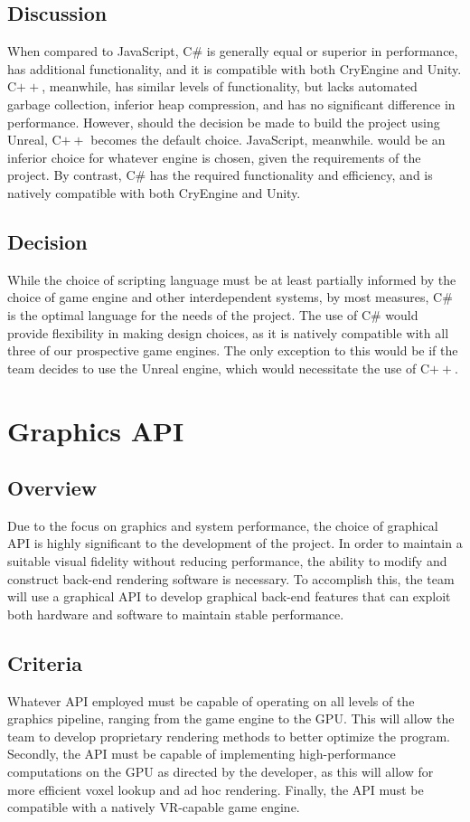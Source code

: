 \documentclass[onecolumn, draftclsnofoot,10pt, compsoc]{IEEEtran}
\begin{document}
\subsection{Discussion}
When compared to JavaScript, C\# is generally equal or superior in performance, has additional functionality, and it is compatible with both CryEngine and Unity. C$++$, meanwhile, has similar levels of functionality, but lacks automated garbage collection, inferior heap compression, and has no significant difference in performance. However, should the decision be made to build the project using Unreal, C$++$ becomes the default choice. JavaScript, meanwhile. would be an inferior choice for whatever engine is chosen, given the requirements of the project. By contrast, C\# has the required functionality and efficiency, and is natively compatible with both CryEngine and Unity. 

\subsection{Decision}
While the choice of scripting language must be at least partially informed by the choice of game engine and other interdependent systems, by most measures, C\# is the optimal language for the needs of the project. The use of C\# would provide flexibility in making design choices, as it is natively compatible with all three of our prospective game engines. The only exception to this would be if the team decides to use the Unreal engine, which would necessitate the use of C$++$.

\section{Graphics API}

\subsection{Overview}
Due to the focus on graphics and system performance, the choice of graphical API is highly significant to the development of the project. In order to maintain a suitable visual fidelity without reducing performance, the ability to modify and construct back-end rendering software is necessary. To accomplish this, the team will use a graphical API to develop graphical back-end features that can exploit both hardware and software to maintain stable performance.

\subsection{Criteria}
Whatever API employed must be capable of operating on all levels of the graphics pipeline, ranging from the game engine to the GPU. This will allow the team to develop proprietary rendering methods to better optimize the program. Secondly, the API must be capable of implementing high-performance computations on the GPU as directed by the developer, as this will allow for more efficient voxel lookup and ad hoc rendering. Finally, the API must be compatible with a natively VR-capable game engine.
\end{document}

